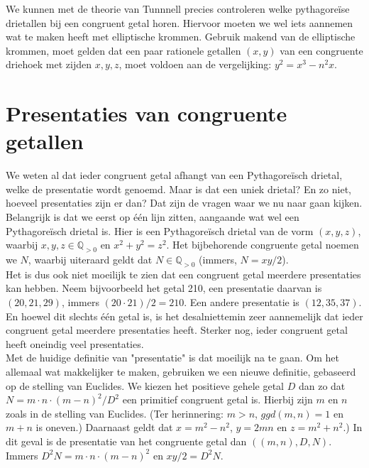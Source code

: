 \documentclass[12pt,reqno]{article}
\newcommand*{\QQ}{\ensuremath{\mathbb{Q}}}
\begin{document}
	We kunnen met de theorie van Tunnnell precies controleren welke pythagore\"ise drietallen bij een congruent getal horen. Hiervoor moeten we wel iets aannemen wat te maken heeft met elliptische krommen. Gebruik makend van de elliptische krommen, moet gelden dat een paar rationele getallen $(x,y)$ van een congruente driehoek met zijden $x,y,z$, moet voldoen aan de vergelijking: $y^2=x^3-n^2x$.
	
	
	\section{Presentaties van congruente getallen}
	We weten al dat ieder congruent getal afhangt van een Pythagore\"isch drietal, welke de presentatie wordt genoemd. Maar is dat een uniek drietal? En zo niet, hoeveel presentaties zijn er dan? Dat zijn de vragen waar we nu naar gaan kijken.\\
	
	Belangrijk is dat we eerst op \'e\'en lijn zitten, aangaande wat wel een Pythagore\"isch drietal is. Hier is een Pythagore\"isch drietal van de vorm $(x,y,z)$, waarbij $x,y,z\in \QQ_{>0}$ en $x^2 + y^2 = z^2$. Het bijbehorende congruente getal noemen we $N$, waarbij uiteraard geldt dat $N\in \QQ_{>0}$ (immers, $N = xy / 2$).\\
	
	Het is dus ook niet moeilijk te zien dat een congruent getal meerdere presentaties kan hebben. Neem bijvoorbeeld het getal 210, een presentatie daarvan is $(20,21,29)$, immers $(20\cdot 21)/2 = 210$. Een andere presentatie is $(12,35,37)$. En hoewel dit slechts \'e\'en getal is, is het desalniettemin zeer aannemelijk dat ieder congruent getal meerdere presentaties heeft. Sterker nog, ieder congruent getal heeft oneindig veel presentaties.\\
	
	Met de huidige definitie van "presentatie" is dat moeilijk na te gaan. Om het allemaal wat makkelijker te maken, gebruiken we een nieuwe definitie, gebaseerd op {\color{red}de stelling van Euclides}. We kiezen het positieve gehele getal $D$ dan zo dat $N=m\cdot n \cdot (m-n)^2/D^2$ een primitief congruent getal is. Hierbij zijn $m$ en $n$ zoals in de stelling van Euclides. (Ter herinnering: $m>n$, $ggd(m,n) = 1$ en $m+n$ is oneven.) Daarnaast geldt dat $x = m^2 - n^2$, $y = 2mn$ en $z = m^2 + n^2$.) In dit geval is de presentatie van het congruente getal dan $((m,n),D,N)$. Immers $D^2N = m\cdot n \cdot (m-n)^2$ en $xy/2 = D^2N$.\\
	
\end{document}
